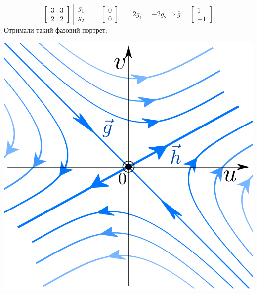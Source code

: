 \begin{example}
    $$
    \begin{bmatrix}
     3 &3 \\
     2 & 2
    \end{bmatrix} \begin{bmatrix}
     g_1 \\
     g_2
    \end{bmatrix} = \begin{bmatrix}
     0 \\
     0
    \end{bmatrix} \qquad 2 g_1 =-2 g_2 \Rightarrow \overline{g} = \begin{bmatrix}
     1 \\
     -1
    \end{bmatrix}
    $$
    Отримали такий фазовий портрет:
    \begin{center} \includegraphics[scale=0.3]{assets/lectures_recent-c4b9c37b.png} \end{center}
    \end{example}


